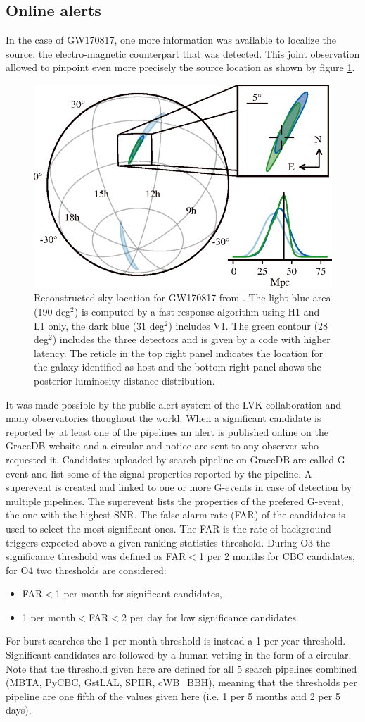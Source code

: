 \subsection{Online alerts}
In the case of GW170817, one more information was available to localize the source: the electro-magnetic counterpart that was detected.
This joint observation allowed to pinpoint even more precisely the source location as shown by figure \ref{fig:gw170817_location}.
%
\begin{figure}
  \centering
  \includegraphics[width=0.5\linewidth]{sectionDetection/gw170817_location.png}
  \caption{Reconstructed sky location for GW170817 from \cite{gw170817}. The light blue area (190 deg$^2$) is computed by a fast-response algorithm using H1 and L1 only, the dark blue (31 deg$^2$) includes V1. The green contour (28 deg$^2$) includes the three detectors and is given by a code with higher latency. The reticle in the top right panel indicates the location for the galaxy identified as host and the bottom right panel shows the posterior luminosity distance distribution.}
  \label{fig:gw170817_location}
\end{figure}
%
It was made possible by the public alert system of the LVK collaboration and many observatories thoughout the world.
When a significant candidate is reported by at least one of the pipelines an alert is published online on the GraceDB website and a circular and notice are sent to any observer who requested it.
Candidates uploaded by search pipeline on GraceDB are called G-event and list some of the signal properties reported by the pipeline.
A superevent is created and linked to one or more G-events in case of detection by multiple pipelines.
The superevent lists the properties of the prefered G-event, the one with the highest SNR.
The false alarm rate (FAR) of the candidates is used to select the most significant ones.
The FAR is the rate of background triggers expected above a given ranking statistics threshold.
During O3 the significance threshold was defined as FAR$<$1 per 2 months for CBC candidates, for O4 two thresholds are considered:
%
\begin{itemize}
\item FAR$<$1 per month for significant candidates,
\item 1 per month$<$FAR$<$2 per day for low significance candidates.
\end{itemize}
%
For burst searches the 1 per month threshold is instead a 1 per year threshold.
Significant candidates are followed by a human vetting in the form of a circular.
Note that the threshold given here are defined for all 5 search pipelines combined (MBTA, PyCBC, GstLAL, SPIIR, cWB\_BBH), meaning that the thresholds per pipeline are one fifth of the values given here (i.e. 1 per 5 months and 2 per 5 days).

